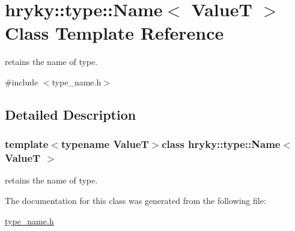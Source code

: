 \hypertarget{classhryky_1_1type_1_1_name}{\section{hryky\-:\-:type\-:\-:Name$<$ Value\-T $>$ Class Template Reference}
\label{classhryky_1_1type_1_1_name}
}


retains the name of type.  




{\ttfamily \#include $<$type\-\_\-name.\-h$>$}



\subsection{Detailed Description}
\subsubsection*{template$<$typename Value\-T$>$class hryky\-::type\-::\-Name$<$ Value\-T $>$}

retains the name of type. 

The documentation for this class was generated from the following file\-:\begin{DoxyCompactItemize}
\item 
\hyperlink{type__name_8h}{type\-\_\-name.\-h}\end{DoxyCompactItemize}
